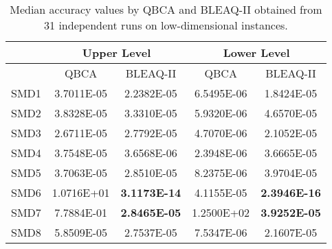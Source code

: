 \documentclass[conference]{IEEEtran}
\theoremstyle{definition}
\begin{document}
\begin{table}[t]
    \caption{Median accuracy values by QBCA and BLEAQ-II obtained from 31 independent
             runs on low-dimensional instances.}
    \label{tab:ll-comparative-vals-5}
    \centering
    \begin{tabular}{|c|c|c|c|c|}
\hline
& \multicolumn{2}{c|}{Upper Level} & \multicolumn{2}{c|}{Lower Level} \\ \hline
& QBCA & BLEAQ-II & QBCA & BLEAQ-II \\ \hline
SMD1 & 3.7011E-05 & 2.2382E-05 & 6.5495E-06 & 1.8424E-05\\ \hline 
SMD2 & 3.8328E-05 & 3.3310E-05 & 5.9320E-06 & 4.6570E-05\\ \hline 
SMD3 & 2.6711E-05 & 2.7792E-05 & 4.7070E-06 & 2.1052E-05\\ \hline 
SMD4 & 3.7548E-05 & 3.6568E-06 & 2.3948E-06 & 3.6665E-05\\ \hline 
SMD5 & 3.7063E-05 & 2.8510E-05 & 8.2375E-06 & 3.9704E-05\\ \hline 
SMD6 & 1.0716E+01 & \textbf{3.1173E-14} & 4.1155E-05 & \textbf{2.3946E-16}\\ \hline 
SMD7 & 7.7884E-01 & \textbf{2.8465E-05} & 1.2500E+02 & \textbf{3.9252E-05}\\ \hline 
SMD8 & 5.8509E-05 & 2.7537E-05 & 7.5347E-06 & 2.1607E-05\\ \hline 
    \end{tabular}
\end{table}
\end{document}
